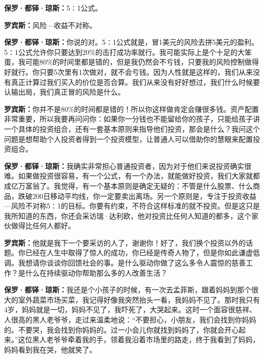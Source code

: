 \begin{BookQuote}
\textbf{保罗·都铎·琼斯：}5∶1公式。
\end{BookQuote}

\begin{BookQuote}
\textbf{罗宾斯：}风险—收益不对称。
\end{BookQuote}

\begin{BookQuote}
\textbf{保罗·都铎·琼斯：}你说的对。5∶1公式就是，冒1美元的风险去拼5美元的盈利。5∶1公式允许你只要达到20\%的击打成功率就行。我可能实际上是个十足的大笨蛋，我可能80\%的时间里都是错的，但是我仍然会不亏钱，只要我的风险控制做得好就行。你只要5次里有1次做对，就不会亏钱。因为人性就是这样的，我们从来没有真正计算过我们买入的价位是否合算。我们从来没有好好想过，我们什么时候要认输出局，我们真正冒的风险是什么。
\end{BookQuote}

\begin{BookQuote}
\textbf{罗宾斯：}你并不是80\%的时间都是错的！所以你这样做肯定会赚很多钱。资产配置非常重要，所以我要再问问你：如果你一分钱也不能留给你的孩子，只能给孩子讲一个具体的投资组合，还有一套基本原则来指导他们投资，那会是什么？我问这个问题是想帮助个人投资者得到一个投资模型，让普通人可以借助你的慧眼来配置投资组合。
\end{BookQuote}

\begin{BookQuote}
\textbf{保罗·都铎·琼斯：}我确实非常担心普通投资者，因为对于他们来说投资确实很难。如果做投资很容易，有一个公式，有一个办法，就能做好投资，我们大家就都成亿万富翁了。我觉得，有一个基本原则是确定无疑的：不管是什么股票、什么商品，跌破200日移动平均线，你一定要卖出离场。另一个原则是，专注于投资收益—风险不对称5∶1的目标。你要有约束，不符合这样标准的就不投资。但是这只是我所知道的东西，你还会采访瑞·达利欧，他对投资比任何人知道的都多，这个家伙做得比任何人都好。
\end{BookQuote}

\begin{BookQuote}
\textbf{罗宾斯：}他就是我下一个要采访的人了，谢谢你！好了，我们换个投资以外的话题。你已经在人生中取得了惊人的成功，你已经是传奇人物了，但是你如此谦虚低调。我想请你谈谈你回馈社会的事。是什么驱动你做了这么多令人震惊的慈善工作？是什么在持续驱动你帮助那么多的人改善生活？
\end{BookQuote}

\begin{BookQuote}
\textbf{保罗·都铎·琼斯：}我还是个小孩子的时候，有一次去孟菲斯，跟着妈妈到那个很大的室外蔬菜市场买菜，我记得好像我突然抬头一看，我妈妈不见了。那时我只有4岁，妈妈就是一切，妈妈不见了，我吓死了，大哭起来。这时一个面容很慈祥、人很高的黑人老爷爷，走过来温柔地说：“不要担心，小朋友，我们会找到你妈妈的。不要哭，我会找到你妈妈的。过一小会儿你就找到妈妈了，你就会开心起来。”这位黑人老爷爷牵着我的手，领着我沿着市场里的路走，终于我看到了妈妈，妈妈看到我在哭，他就笑了。
\end{BookQuote}

